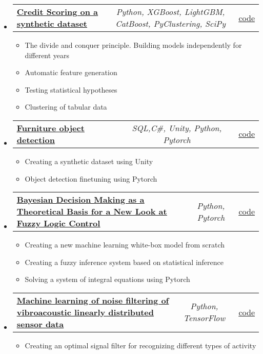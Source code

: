 \documentclass[a4paper,11pt]{article}
\makeatletter
\newcommand{\resumeItem}[1]{
  \item\small{#1}
}
\newcommand{\resumeItemListStart}{\begin{itemize}[rightmargin=0.11in]}
\newcommand{\resumeItemListEnd}{\end{itemize}}
\newcommand{\resumeTrioHeading}[3]{
  \item\small{
    \begin{tabular*}{0.96\textwidth}[t]{
      l@{\extracolsep{\fill}}c@{\extracolsep{\fill}}r
    }
      \textbf{#1} & \textit{#2} & #3
    \end{tabular*}
  }
}
\newcommand{\resumeHeadingListStart}{
  \begin{itemize}[leftmargin=0.15in, label={}]
}
\newcommand{\resumeHeadingListEnd}{\end{itemize}}
\makeatother
\begin{document}
  \resumeHeadingListStart{}
        \resumeTrioHeading{\href{https://github.com/RepnikovPavel/FinancialData}{\uline{Credit Scoring on a synthetic dataset}}}{Python, XGBoost, LightGBM, CatBoost, PyClustering, SciPy}{\href{https://github.com/RepnikovPavel/FinancialData}{\uline{\faGithubSquare code}}}
    \resumeItemListStart{}
    \resumeItem{The divide and conquer principle. Building models independently for different years}
    \resumeItem{Automatic feature generation}
    \resumeItem{Testing statistical hypotheses}
    \resumeItem{Clustering of tabular data}
    \resumeItemListEnd{}
    \resumeHeadingListEnd
    


  \resumeHeadingListStart{}
        \resumeTrioHeading{\href{https://github.com/RepnikovPavel/FurnitureDetection}{\uline{Furniture object detection}}}{ SQL,C\#, Unity, Python, Pytorch}{\href{https://github.com/RepnikovPavel/FurnitureDetection}{\uline{\faGithubSquare code}}}
    \resumeItemListStart{}
    \resumeItem{Creating a synthetic dataset using Unity}
    \resumeItem{Object detection finetuning using Pytorch}
    \resumeItemListEnd{}
    \resumeHeadingListEnd

  
  \resumeHeadingListStart{}
    \resumeTrioHeading{\href{https://drive.google.com/drive/u/0/folders/1zftI7n1gPzwnwDx0ypsb0sOc0G7IpfPW}{\uline{Bayesian Decision Making as a Theoretical Basis for a New Look at Fuzzy Logic Control}}}{Python, Pytorch}{\href{https://github.com/RepnikovPavel/statistical_decision_making}{\uline{\faGithubSquare code}}}
        \resumeItemListStart{}
        \resumeItem{Creating a new machine learning white-box model from scratch}
        \resumeItem{Creating a fuzzy inference system based on statistical inference}
        \resumeItem{Solving a system of integral equations using Pytorch}
        \resumeItemListEnd{}
\resumeHeadingListEnd

\resumeHeadingListStart{}
    \resumeTrioHeading{\href{https://drive.google.com/drive/u/0/folders/1q2EaWoaNGiwG4w1tQbm2k_c_2cM4j4Uv}{\uline{Machine learning of noise filtering of vibroacoustic linearly distributed sensor data}}}{Python, TensorFlow}{\href{https://github.com/RepnikovPavel/kursach_filtr_of_signal}{\uline{\faGithubSquare code}}}
        \resumeItemListStart{}
          \resumeItem{Creating an optimal signal filter for recognizing different types of activity}
        \resumeItemListEnd{}
    \resumeHeadingListEnd
\end{document}
